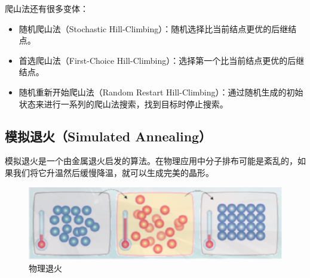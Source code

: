 \begin{figure}[H]
    \centering
\end{figure}

爬山法还有很多变体：

\begin{itemize}
    \item 随机爬山法（Stochastic Hill-Climbing）：随机选择比当前结点更优的后继结点。
    \item 首选爬山法（First-Choice Hill-Climbing）：选择第一个比当前结点更优的后继结点。
    \item 随机重新开始爬山法（Random Restart Hill-Climbing）：通过随机生成的初始状态来进行一系列的爬山法搜索，找到目标时停止搜索。
\end{itemize}

\vspace{0.5cm}

\subsection{模拟退火（Simulated Annealing）}

模拟退火是一个由金属退火启发的算法。在物理应用中分子排布可能是紊乱的，如果我们将它升温然后缓慢降温，就可以生成完美的晶形。\\

\begin{figure}[H]
    \centering
    \includegraphics{img/C1/1-6/2.png}
    \caption{物理退火}
\end{figure}

